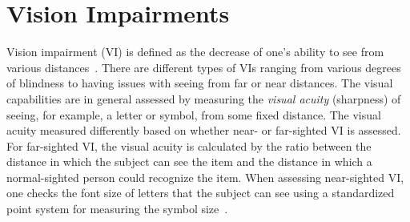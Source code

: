 



\section{Vision Impairments}\label{sec:vision_impairments}

Vision impairment (VI) is defined as the decrease of one's ability to see from various distances~\cite{who2022international}. There are different types of VIs ranging from various degrees of blindness to having issues with seeing from far or near distances. The visual capabilities are in general assessed by measuring the \textit{visual acuity} (sharpness) of seeing, for example, a letter or symbol, from some fixed distance. The visual acuity measured differently based on whether near- or far-sighted VI is assessed. For far-sighted VI, the visual acuity is calculated by the ratio between the distance in which %
the subject can see the item and the distance in which a normal-sighted person could recognize the item. When assessing near-sighted VI, one checks the font size of letters that the subject can see using a standardized point system for measuring the symbol size~\cite{who2019world}. %

